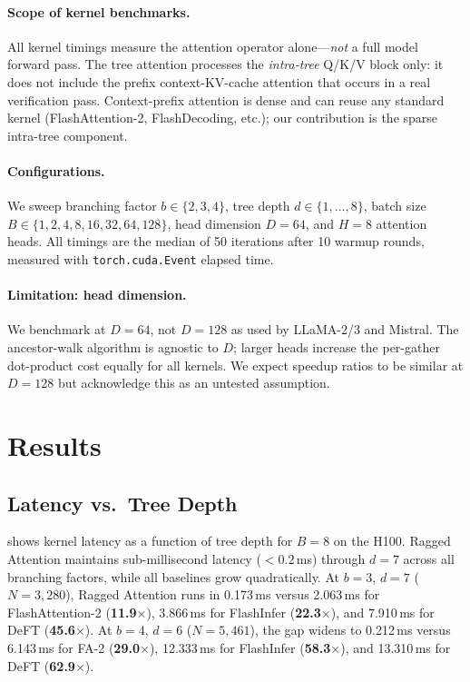 \documentclass{article}
\newcommand{\method}{Ragged Attention}
\newcommand{\numtokens}{N}
\newcommand{\depth}{d}
\newcommand{\branching}{b}
\newcommand{\headdim}{D}
\newcommand{\nheads}{H}
\newcommand{\batchsize}{B}
\begin{document}
\paragraph{Scope of kernel benchmarks.}
All kernel timings measure the attention operator alone—\emph{not} a
full model forward pass.
The tree attention processes the \emph{intra-tree} Q/K/V block only:
it does not include the prefix context-KV-cache attention that occurs
in a real verification pass.
Context-prefix attention is dense and can reuse any standard kernel
(FlashAttention-2, FlashDecoding, etc.); our contribution is the
sparse intra-tree component.

\paragraph{Configurations.}
We sweep branching factor $\branching \in \{2, 3, 4\}$,
tree depth $\depth \in \{1, \ldots, 8\}$,
batch size $\batchsize \in \{1, 2, 4, 8, 16, 32, 64, 128\}$,
head dimension $\headdim = 64$, and $\nheads = 8$ attention heads.
All timings are the median of 50 iterations after 10 warmup rounds,
measured with \texttt{torch.cuda.Event} elapsed time.

\paragraph{Limitation: head dimension.}
We benchmark at $\headdim = 64$, not $\headdim = 128$ as used by
LLaMA-2/3 and Mistral.
The ancestor-walk algorithm is agnostic to $\headdim$; larger heads
increase the per-gather dot-product cost equally for all kernels.
We expect speedup ratios to be similar at $\headdim = 128$ but
acknowledge this as an untested assumption.

\section{Results}\label{sec:results}

\subsection{Latency vs.\ Tree Depth}

 shows kernel latency as a function of tree
depth for $\batchsize = 8$ on the H100.
\method{} maintains sub-millisecond latency ($< 0.2$\,ms) through
$\depth = 7$ across all branching factors, while all baselines grow
quadratically.  At $\branching = 3$, $\depth = 7$
($\numtokens = 3{,}280$), \method{} runs in 0.173\,ms
versus 2.063\,ms for FlashAttention-2 (\textbf{11.9$\times$}),
3.866\,ms for FlashInfer (\textbf{22.3$\times$}), and
7.910\,ms for DeFT (\textbf{45.6$\times$}).
At $\branching = 4$, $\depth = 6$ ($\numtokens = 5{,}461$), the gap
widens to 0.212\,ms versus 6.143\,ms for FA-2 (\textbf{29.0$\times$}),
12.333\,ms for FlashInfer (\textbf{58.3$\times$}), and
13.310\,ms for DeFT (\textbf{62.9$\times$}).
\end{document}
